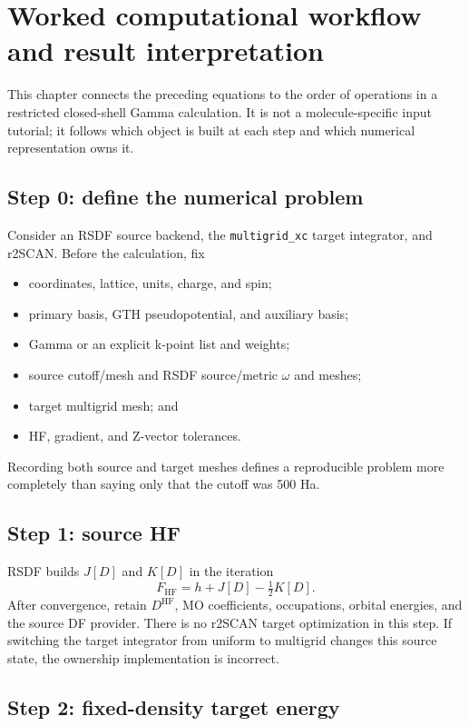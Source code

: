 \section{Worked computational workflow and result interpretation}
\label{sec:worked-workflow}

This chapter connects the preceding equations to the order of operations in
a restricted closed-shell Gamma calculation.  It is not a molecule-specific
input tutorial; it follows which object is built at each step and which
numerical representation owns it.

\subsection{Step 0: define the numerical problem}

Consider an RSDF source backend, the \texttt{multigrid\_xc} target integrator,
and r2SCAN.  Before the calculation, fix
\begin{itemize}
  \item coordinates, lattice, units, charge, and spin;
  \item primary basis, GTH pseudopotential, and auxiliary basis;
  \item Gamma or an explicit k-point list and weights;
  \item source cutoff/mesh and RSDF source/metric $\omega$ and meshes;
  \item target multigrid mesh; and
  \item HF, gradient, and Z-vector tolerances.
\end{itemize}
Recording both source and target meshes defines a reproducible problem more
completely than saying only that the cutoff was 500 Ha.

\subsection{Step 1: source HF}

RSDF builds $J[D]$ and $K[D]$ in the iteration
\begin{equation}
  F_{\mathrm{HF}}=h+J[D]-\tfrac12K[D].
\end{equation}
After convergence, retain $D^{\mathrm{HF}}$, MO coefficients, occupations,
orbital energies, and the source DF provider.  There is no r2SCAN target
optimization in this step.  If switching the target integrator from uniform
to multigrid changes this source state, the ownership implementation is
incorrect.

\subsection{Step 2: fixed-density target energy}

